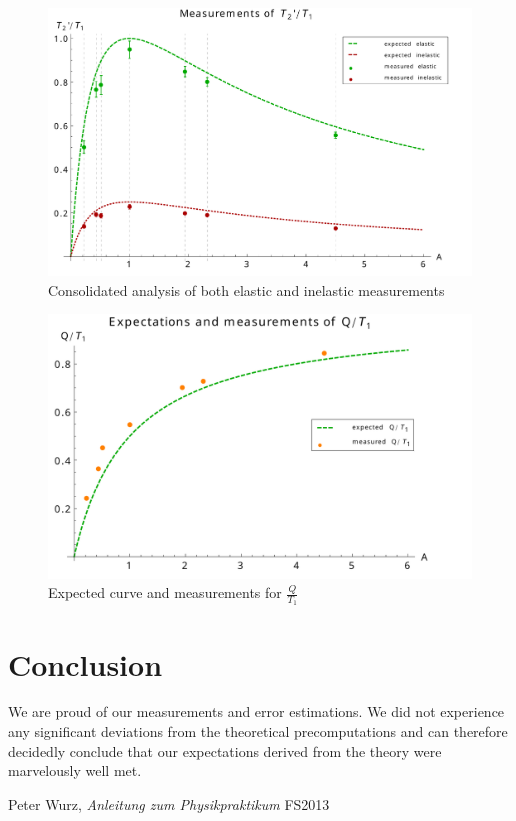 \documentclass{scrreprt}
\renewcommand{\emph}[1]{\textit{#1}}
\begin{document}
\begin{figure}[H]
	\centering
  \includegraphics[width=1.0\textwidth]{diag/error.pdf}
	\caption{Consolidated analysis of both elastic and inelastic measurements}
	\label{fig:analysis}
\end{figure}

\begin{figure}[H]
	\centering
  \includegraphics[width=1.0\textwidth]{diag/q_t1.pdf}
	\caption{Expected curve and measurements for $\frac{Q}{T_1}$}
	\label{fig:qt1}
\end{figure}

\section{Conclusion}
We are proud of our measurements and error estimations. We did not experience any significant deviations from the theoretical precomputations and can therefore decidedly conclude that our expectations derived from the theory were marvelously well met. 

\begin{thebibliography}{9}
  Peter Wurz,
  \emph{Anleitung zum Physikpraktikum}
  FS2013

\end{thebibliography}
\end{document}
